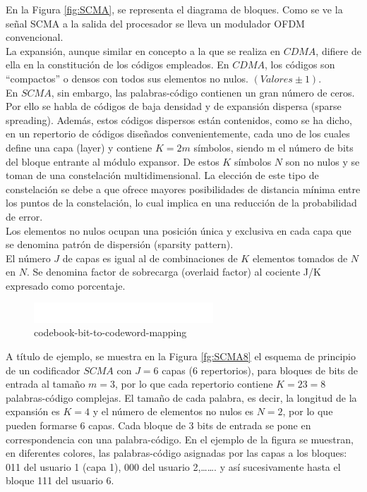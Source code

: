 \documentclass[]{article}
\begin{document}
En la Figura \ref{fig:SCMA}, se representa el diagrama de bloques. Como se ve la señal SCMA a la salida del procesador se lleva un modulador OFDM convencional.\\

La expansión, aunque similar en concepto a la que se realiza en $CDMA$, difiere de ella en la constitución de los códigos empleados. En $CDMA$, los códigos son “compactos” o densos con todos sus elementos no nulos. $(Valores \pm 1)$.\\
 
En $SCMA$, sin embargo, las palabras-código contienen un gran número de ceros. Por ello se habla de códigos de baja densidad y de expansión dispersa (sparse spreading). Además, estos códigos dispersos están contenidos, como se ha dicho, en un repertorio de códigos diseñados convenientemente, cada uno de los cuales define una capa (layer) y contiene $K=2m$ símbolos, siendo m el número de bits del bloque entrante al módulo expansor. De estos $K$ símbolos $N$ son no nulos y se toman de una constelación multidimensional. La elección de este tipo de constelación se debe a que ofrece mayores posibilidades de distancia mínima entre los puntos de la constelación, lo cual implica en una reducción de la probabilidad de error.\\

Los elementos no nulos ocupan una posición única y exclusiva en cada capa que se denomina patrón de dispersión (sparsity pattern).\\

El número $J$ de capas es igual al de combinaciones de $K$ elementos tomados de $N$ en $N$. Se denomina factor de sobrecarga (overlaid factor) al cociente J/K expresado como porcentaje.\\



\begin{figure}[h!]
	\centering
	\includegraphics[width=0.6\textwidth]{Imagenes/SCMA8.png}
	\caption{codebook-bit-to-codeword-mapping}
	\label{fig:SCMA8}
\end{figure}



A título de ejemplo, se muestra en la Figura \ref{fg:SCMA8} el esquema de principio de un codificador $SCMA$ con $J = 6$ capas (6 repertorios), para bloques de bits de entrada al tamaño $m = 3$, por lo que cada repertorio contiene $K = 23 = 8$ palabras-código complejas. El tamaño de cada palabra, es decir, la longitud de la expansión es $K = 4$ y el número de elementos no nulos es $N = 2$, por lo que pueden formarse 6 capas. 
Cada bloque de 3 bits de entrada se pone en correspondencia con una palabra-código. En el ejemplo de la figura se muestran, en diferentes colores, las palabras-código asignadas por las capas a los bloques: 011 del usuario 1 (capa 1), 000 del usuario 2,……. y así sucesivamente hasta el bloque 111 del usuario 6.\\
\end{document}
